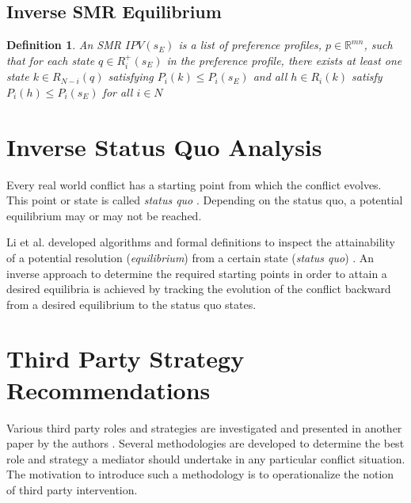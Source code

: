 \documentclass[letterpaper,12pt,titlepage,oneside,final]{book}
\newtheorem{definition}[lemma]{Definition}
\begin{document}
\subsection{Inverse SMR Equilibrium}

\begin{definition}
\label{def:smr_inv}
\rm
An \emph{SMR $IPV(s_E)$} is a list of preference profiles, $p \in \mathbb{R}^{mn}$, such that for each state $q \in R^{+}_{i}(s_E)$ in the preference profile, there exists at least one state $k\in R_{N-i}(q)$ satisfying $P_i(k)\leq P_i(s_E)$ and all $h \in R_{i}(k)$ satisfy $P_i(h)\leq P_i(s_E)$ for all %
$i \in N$ 
\end{definition}


\section{Inverse Status Quo Analysis}
Every real world conflict has a starting point from which the conflict evolves. This point or state is called \emph{status quo} \cite{fang1993}. Depending on the status quo, a potential equilibrium may or may not be reached. 

Li et al. developed algorithms and formal definitions to inspect the attainability of a potential resolution (\emph{equilibrium}) from a certain state (\emph{status quo}) \cite{li2004squo,li2005squo}. An inverse approach to determine the required starting points in order to attain a desired equilibria is achieved by tracking the evolution of the conflict backward from a desired equilibrium to the status quo states.

\section{Third Party Strategy Recommendations}
Various third party roles and strategies are investigated and presented in another paper by the authors \cite{rami2012smc} . Several methodologies are developed to determine the best role and strategy a mediator should undertake in any particular conflict situation. The motivation to introduce such a methodology is to operationalize the notion of third party intervention.
\end{document}
